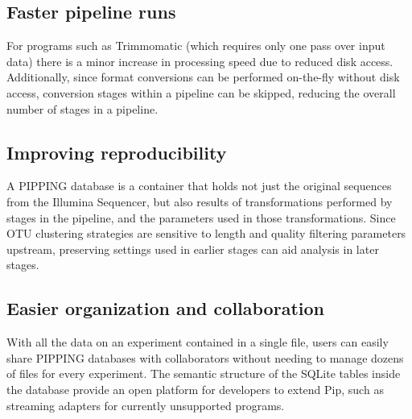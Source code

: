 \documentclass[12pt]{article}
\begin{document}

	\subsection{Faster pipeline runs} %
	\label{sub:faster_pipeline_runs}
	For programs such as Trimmomatic (which requires only one pass over input data) there
	is a minor increase in processing speed due to reduced disk access. Additionally, since
	format conversions can be performed on-the-fly without disk access, conversion stages
	within a pipeline can be skipped, reducing the overall number of stages in a pipeline.

	\subsection{Improving reproducibility} %
	\label{sub:improving_reproducibility}
	A PIPPING database is a container that holds not just the original sequences from the 
	Illumina Sequencer, but also results of transformations performed by stages in 
	the pipeline, and the parameters used in those transformations. Since OTU clustering 
	strategies are sensitive to length and quality filtering parameters upstream, preserving settings 
	used in earlier stages can aid analysis in later stages.

	\subsection{Easier organization and collaboration} %
	\label{sub:easier_organization_and_collaboration}
	With all the data on an experiment contained in a single file, users can easily 
	share PIPPING databases with collaborators without needing to manage dozens of files 
	for every experiment. The semantic structure of the SQLite tables inside the database
	provide an open platform for developers to extend Pip, such as streaming adapters 
	for currently unsupported programs.
	
	
\end{document}
